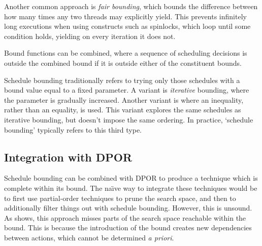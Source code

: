 Another common approach is \emph{fair bounding}\cite{musuvathi2008},
which bounds the difference between how many times any two threads may
explicitly yield.  This prevents infinitely long executions when using
constructs such as spinlocks, which loop until some condition holds,
yielding on every iteration it does not.

Bound functions can be combined, where a sequence of scheduling
decisions is outside the combined bound if it is outside either of the
constituent bounds.

Schedule bounding traditionally refers to trying only those schedules
with a bound value equal to a fixed parameter.  A variant is
\emph{iterative} bounding, where the parameter is gradually
increased\cite{musuvathi2007}.  Another variant is where an
inequality, rather than an equality, is used.  This variant explores
the same schedules as iterative bounding, but doesn't impose the same
ordering.  In practice, `schedule bounding' typically refers to this
third type.

\subsection{Integration with DPOR}

Schedule bounding can be combined with DPOR to produce a technique
which is complete within its bound.  The na\"{\i}ve way to integrate
these techniques would be to first use partial-order techniques to
prune the search space, and then to additionally filter things out
with schedule bounding.  However, this is unsound.  As
 shows, this approach misses parts of the
search space reachable within the bound.  This is because the
introduction of the bound creates new dependencies between actions,
which cannot be determined \emph{a priori}\cite{coons2013}.

